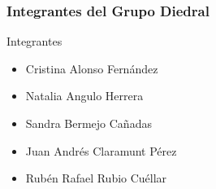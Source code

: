 \documentclass{beamer}
\begin{document}
\begin{frame}
	\frametitle{Integrantes del Grupo Diedral}

	\begin{block}{Integrantes}
		\begin{itemize}
			\item Cristina Alonso Fernández
			\item Natalia Angulo Herrera
			\item Sandra Bermejo Cañadas
			\item Juan Andrés Claramunt Pérez
			\item Rubén Rafael Rubio Cuéllar
		\end{itemize}
	\end{block}
\end{frame}
\end{document}
